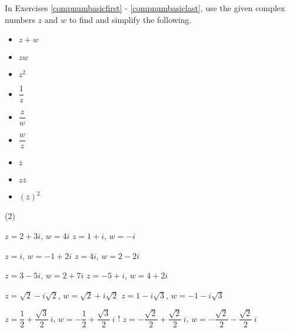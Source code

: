\label{ExercisesforAppCmpNums}

In Exercises \ref{compnumbasicfirst} - \ref{compnumbasiclast}, use the given complex numbers $z$ and $w$ to find and simplify the following. 

\begin{multicols}{3}

\begin{itemize}

\item $z+w$
\item $zw$
\item $z^2$

\end{itemize}

\end{multicols}

\begin{multicols}{3}

\begin{itemize}

\item $\dfrac{1}{z}$
\item $\dfrac{z}{w}$
\item $\dfrac{w}{z}$

\end{itemize}

\end{multicols}

\begin{multicols}{3}

\begin{itemize}

\item $\overline{z}$
\item $z\overline{z}$
\item $(\overline{z})^2$

\end{itemize}

\end{multicols}

\begin{tasks}(2)

\task  $z = 2+3i$, $w = 4i$ \label{compnumbasicfirst}
\task  $z = 1+i$, $w = -i$

\task  $z = i$, $w = -1+2i$
\task  $z = 4i$, $w = 2-2i$

\task  $z = 3-5i$, $w = 2+7i$
\task  $z = -5+i$, $w = 4+2i$

\task  $z = \sqrt{2} - i\sqrt{2}$, $w = \sqrt{2} + i\sqrt{2}$
\task  $z = 1 - i\sqrt{3}$, $w = -1 - i\sqrt{3}$

\task  $z = \dfrac{1}{2} + \dfrac{\sqrt{3}}{2} \, i$, $w = -\dfrac{1}{2} + \dfrac{\sqrt{3}}{2} \,i$
\task! $z = -\dfrac{\sqrt{2}}{2} + \dfrac{\sqrt{2}}{2} \, i$, $w = -\dfrac{\sqrt{2}}{2} - \dfrac{\sqrt{2}}{2} \, i$ \label{compnumbasiclast}

\end{tasks}

